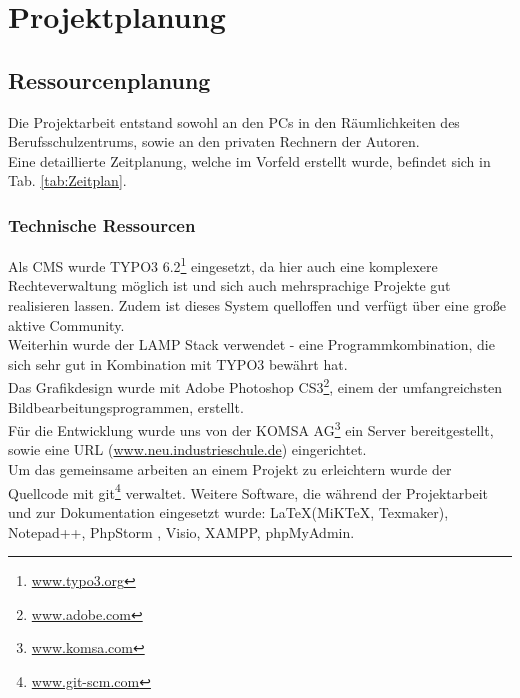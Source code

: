 \section{Projektplanung} 
\label{sec:Projektplanung}

\subsection{Ressourcenplanung}
\label{sec:Ressourcenplanung}
Die Projektarbeit entstand sowohl an den PCs in den Räumlichkeiten 
des Berufsschulzentrums, sowie an den privaten Rechnern der Autoren.\\
Eine detaillierte Zeitplanung, welche im Vorfeld erstellt wurde, befindet sich in Tab. \ref{tab:Zeitplan}.

\subsubsection{Technische Ressourcen}
\label{sec:TechnischeRessourcen}
Als \acs{CMS} wurde TYPO3 6.2\footnote{\href{www.typo3.org}{www.typo3.org}} 
eingesetzt, da hier auch eine komplexere 
Rechteverwaltung möglich ist und sich auch mehrsprachige Projekte
gut realisieren lassen. Zudem ist dieses System quelloffen und verfügt
über eine große aktive Community.\\
Weiterhin wurde der \acs{LAMP Stack} verwendet - eine Programmkombination, 
die sich sehr gut in Kombination mit TYPO3 bewährt hat.\\
Das Grafikdesign wurde mit Adobe Photoshop 
CS3\footnote{\href{http://www.adobe.com/de/products/photoshop.html}{www.adobe.com}}, 
einem der umfangreichsten Bildbearbeitungsprogrammen, erstellt.\\
Für die Entwicklung wurde uns von der KOMSA AG\footnote{\href{https://komsa.com/de/start/}{www.komsa.com}}
ein Server bereitgestellt, sowie eine \acs{URL} (\url{www.neu.industrieschule.de}) eingerichtet.\\
Um das gemeinsame arbeiten an einem Projekt zu erleichtern wurde der Quellcode mit 
git\footnote{\href{https://git-scm.com/}{www.git-scm.com}} verwaltet.
Weitere Software, die während der Projektarbeit und zur Dokumentation eingesetzt wurde: \LaTeX (MiKTeX, Texmaker), Notepad++, PhpStorm
, Visio, XAMPP, phpMyAdmin.


